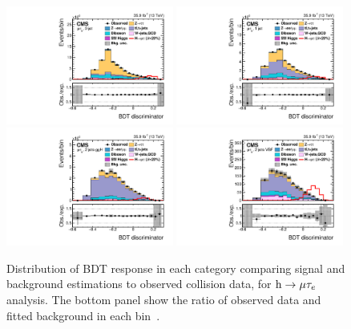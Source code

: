 \begin{figure}[!htpb]\centering
   \captionsetup{width=.98\textwidth,justification=centering}
 \includegraphics[width=0.49\textwidth]{plots_and_figures/chapter8/h125/0jetBDT.pdf}
 \includegraphics[width=0.49\textwidth]{plots_and_figures/chapter8/h125/1jetBDT.pdf} \\
 \includegraphics[width=0.49\textwidth]{plots_and_figures/chapter8/h125/2jetggBDT.pdf}
 \includegraphics[width=0.49\textwidth]{plots_and_figures/chapter8/h125/2jetvbBDT.pdf} 
\caption{Distribution of BDT response in each category comparing signal and background estimations to observed collision data, for $\text{h} \to \mu \tau_{e}$ analysis. The bottom panel show the ratio of observed data and fitted background in each bin~\cite{HIG-17-001}.}
 \label{fig:BDT_dist_hmue}
\end{figure}

